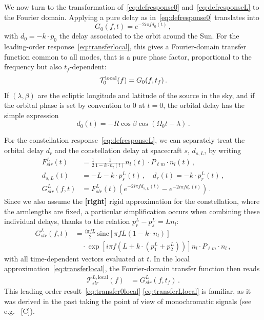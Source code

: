 \documentclass[aps,showpacs,twocolumn,
prd,superscriptaddress,nofootinbib]{revtex4-1}
\newcommand{\be}{\begin{equation}}
\newcommand{\ee}{\end{equation}}
\newcommand\calT{{\mathcal{T}}}
\newcommand{\nn}{\nonumber}
\newcommand{\hatk}{k}
\newcommand{\sinc}{\,\mathrm{sinc}}
\newcommand{\tf}{t_{f}}
\newcommand{\SM}[1]{{\color{Red} #1}}
\newcommand{\jgb}[1]{{\color{DarkGreen} #1}}
\begin{document}
We now turn to the transformation of~\eqref{eq:defresponse0} and~\eqref{eq:defresponseL} to the Fourier domain. Applying a pure delay as in~\eqref{eq:defresponse0} translates into
\be\label{eq:G0}
	G_{0}(f, t) = e^{-2i\pi f d_{0}(t)} \,,
\ee
with $d_{0} = -\hatk \cdot p_{0}$ the delay associated to the orbit around the Sun. For the leading-order response~\eqref{eq:transferlocal}, this gives a Fourier-domain transfer function common to all modes, that is a pure phase factor, proportional to the frequency but also $t_{f}$-dependent:
\be\label{eq:transfer0local}
	\calT_{0}^{\rm local}(f) = G_{0}(f, \tf)\,.
\ee
If $(\lambda, \beta)$ are the ecliptic longitude and latitude of the source in the sky, and if the orbital phase is set by convention to $0$ at $t=0$, the orbital delay has the simple expression
\be\label{eq:delay0}
	d_{0}(t) = -R \cos\beta \cos\left(\Omega_{0}t - \lambda\right)\,.
\ee

For the constellation response~\eqref{eq:defresponseL}, we can \jgb{separately treat the orbital delay $d_r$ and the constellation delay at spacecraft $s$, $d_{s,L}$}, by writing
\begin{align}\label{eq:decomposeGslr}
	F_{slr}^{L}(t) &= \frac{1}{2} \frac{1}{1 - \hatk\cdot n_{l}(t)} n_{l}(t) \cdot P_{\ell m} \cdot n_{l} (t) \,,\nn\\
	d_{s,L}(t) &= -L - k\cdot p_{s}^{L}(t) \,, \quad d_{r}(t) = - k\cdot p_{r}^{L}(t) \,,\nn\\
	G_{slr}^{L}(f,t) &=  F_{slr}^{L}(t) \left( e^{-2i\pi f d_{s,L}(t)} - e^{-2i\pi f d_{r}(t)} \right) \,.
\end{align}
\jgb{Since we also assume the {\bf[right]} } rigid approximation for the constellation, where the armlengths are fixed, a particular simplification occurs when combining these individual delays, thanks to the relation $p^{L}_{r} - p^{L}_{s} =  L n_{l}$:
\begin{align}\label{eq:GslrL}
	G_{slr}^{L}(f,t) &= \frac{i \pi f L}{2} \sinc \left[ \pi f L\left(1-\hatk\cdot n_{l} \right) \right] \nn\\
	& \quad \cdot \exp\left[ i \pi f \left( L + \hatk\cdot \left( p_{1}^{L} + p_{2}^{L} \right) \right) \right]  n_{l} \cdot P_{\ell m} \cdot n_{l} \,,
\end{align}
with all time-dependent vectors evaluated at $t$. In the local approximation~\eqref{eq:transferlocal}, the Fourier-domain transfer function then reads
\begin{align}\label{eq:transferLlocal}
	\calT_{slr}^{L, \mathrm{local}}(f) &= G_{slr}^{L}(f, \tf) \,.
\end{align}
This leading-order result~\eqref{eq:transfer0local}-\eqref{eq:transferLlocal} is familiar, as it was derived in the past taking the point of view of monochromatic signals (see e.g.~\cite{} \SM{[C]}).
\end{document}
